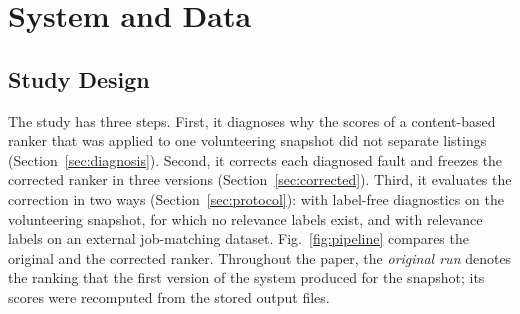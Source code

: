 \documentclass[CHICAGO]{USG}
\begin{document}
\section{System and Data}
\label{sec:system}

\subsection{Study Design}
\label{sec:design}
The study has three steps. First, it diagnoses why the scores of a content-based ranker that was applied to one volunteering snapshot did not separate listings (Section~\ref{sec:diagnosis}). Second, it corrects each diagnosed fault and freezes the corrected ranker in three versions (Section~\ref{sec:corrected}). Third, it evaluates the correction in two ways (Section~\ref{sec:protocol}): with label-free diagnostics on the volunteering snapshot, for which no relevance labels exist, and with relevance labels on an external job-matching dataset. Fig.~\ref{fig:pipeline} compares the original and the corrected ranker. Throughout the paper, the \emph{original run} denotes the ranking that the first version of the system produced for the snapshot; its scores were recomputed from the stored output files.
\end{document}
